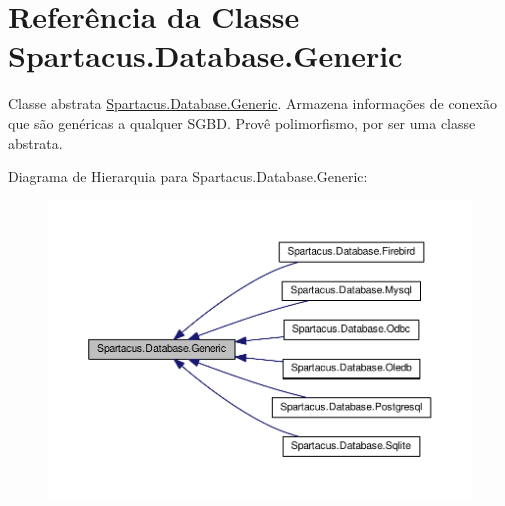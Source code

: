 \hypertarget{classSpartacus_1_1Database_1_1Generic}{\section{Referência da Classe Spartacus.\+Database.\+Generic}
\label{classSpartacus_1_1Database_1_1Generic}
}


Classe abstrata \hyperlink{classSpartacus_1_1Database_1_1Generic}{Spartacus.\+Database.\+Generic}. Armazena informações de conexão que são genéricas a qualquer S\+G\+B\+D. Provê polimorfismo, por ser uma classe abstrata.  




Diagrama de Hierarquia para Spartacus.\+Database.\+Generic\+:
\nopagebreak
\begin{figure}[H]
\begin{center}
\leavevmode
\includegraphics[width=350pt]{classSpartacus_1_1Database_1_1Generic__inherit__graph}
\end{center}
\end{figure}
